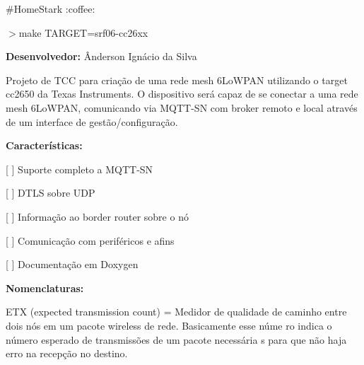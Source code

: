 \#\+Home\+Stark \+:coffee\+: 

$>$make T\+A\+R\+G\+E\+T=srf06-\/cc26xx

{\bfseries Desenvolvedor\+:} Ânderson Ignácio da Silva

Projeto de T\+C\+C para criação de uma rede mesh 6\+Lo\+W\+P\+A\+N utilizando o target cc2650 da Texas Instruments. O dispositivo será capaz de se conectar a uma rede mesh 6\+Lo\+W\+P\+A\+N, comunicando via M\+Q\+T\+T-\/\+S\+N com broker remoto e local através de um interface de gestão/configuração.

{\bfseries Características\+:}
\begin{DoxyItemize}
\item \mbox{[} \mbox{]} Suporte completo a M\+Q\+T\+T-\/\+S\+N
\item \mbox{[} \mbox{]} D\+T\+L\+S sobre U\+D\+P
\item \mbox{[} \mbox{]} Informação ao border router sobre o nó
\item \mbox{[} \mbox{]} Comunicação com periféricos e afins
\item \mbox{[} \mbox{]} Documentação em Doxygen
\end{DoxyItemize}

{\bfseries Nomenclaturas\+:}

E\+T\+X (expected transmission count) = Medidor de qualidade de caminho entre dois nós em um pacote wireless de rede. Basicamente esse núme ro indica o número esperado de transmissões de um pacote necessária s para que não haja erro na recepção no destino. 